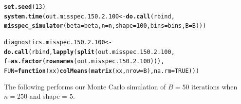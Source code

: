 \documentclass[11pt]{article}\usepackage[]{graphicx}\usepackage[]{color}
\makeatletter
\newcommand{\hlnum}[1]{\textcolor[rgb]{0.686,0.059,0.569}{#1}}%
\newcommand{\hlstd}[1]{\textcolor[rgb]{0.345,0.345,0.345}{#1}}%
\newcommand{\hlkwa}[1]{\textcolor[rgb]{0.161,0.373,0.58}{\textbf{#1}}}%
\newcommand{\hlkwb}[1]{\textcolor[rgb]{0.69,0.353,0.396}{#1}}%
\newcommand{\hlkwc}[1]{\textcolor[rgb]{0.333,0.667,0.333}{#1}}%
\newcommand{\hlkwd}[1]{\textcolor[rgb]{0.737,0.353,0.396}{\textbf{#1}}}%
\newenvironment{kframe}{%
 \def\at@end@of@kframe{}%
 \ifinner\ifhmode%
  \def\at@end@of@kframe{\end{minipage}}%
  \begin{minipage}{\columnwidth}%
 \fi\fi%
 \def\FrameCommand##1{\hskip\@totalleftmargin \hskip-\fboxsep
 \colorbox{shadecolor}{##1}\hskip-\fboxsep
     \hskip-\linewidth \hskip-\@totalleftmargin \hskip\columnwidth}%
 \MakeFramed {\advance\hsize-\width
   \@totalleftmargin\z@ \linewidth\hsize
   \@setminipage}}%
 {\par\unskip\endMakeFramed%
 \at@end@of@kframe}
\newenvironment{knitrout}{}{} %
\makeatother
\begin{document}
\begin{knitrout}
\color{fgcolor}\begin{kframe}
\begin{alltt}
\hlkwd{set.seed}\hlstd{(}\hlnum{13}\hlstd{)}
\hlkwd{system.time}\hlstd{(out.misspec.150.2.100} \hlkwb{<-} \hlkwd{do.call}\hlstd{(rbind,}
  \hlkwd{misspec_simulator}\hlstd{(}\hlkwc{beta} \hlstd{= beta,} \hlkwc{n} \hlstd{= n,} \hlkwc{shape} \hlstd{=} \hlnum{100}\hlstd{,} \hlkwc{bins} \hlstd{= bins,} \hlkwc{B} \hlstd{= B)))}
\end{alltt}


{\ttfamily\noindent\bfseries\color{errorcolor}{\#\# Error in chol.default(crossprod(x) + lambda[j] * diag(v)): the leading minor of order 5 is not positive definite}}

{\ttfamily\noindent\itshape\color{messagecolor}{\#\# Timing stopped at: 0.673 0 0.672}}\begin{alltt}
\hlstd{diagnostics.misspec.150.2.100} \hlkwb{<-} \hlkwd{do.call}\hlstd{(rbind,} \hlkwd{lapply}\hlstd{(}\hlkwd{split}\hlstd{(out.misspec.150.2.100,}
  \hlkwc{f} \hlstd{=} \hlkwd{as.factor}\hlstd{(}\hlkwd{rownames}\hlstd{(out.misspec.150.2.100))),}
  \hlkwc{FUN} \hlstd{=} \hlkwa{function}\hlstd{(}\hlkwc{xx}\hlstd{)} \hlkwd{colMeans}\hlstd{(}\hlkwd{matrix}\hlstd{(xx,} \hlkwc{nrow} \hlstd{= B),} \hlkwc{na.rm} \hlstd{=} \hlnum{TRUE}\hlstd{)))}
\end{alltt}


{\ttfamily\noindent\bfseries\color{errorcolor}{\#\# Error in split(out.misspec.150.2.100, f = as.factor(rownames(out.misspec.150.2.100))): object 'out.misspec.150.2.100' not found}}\end{kframe}
\end{knitrout}



\begin{knitrout}
\color{fgcolor}\begin{kframe}


{\ttfamily\noindent\bfseries{}}\end{kframe}
\end{knitrout}


The following performs our Monte Carlo simulation of $B = 50$ iterations 
when $n = 250$ and shape = $5$. 
\end{document}
